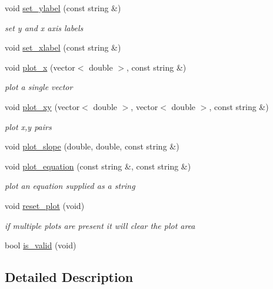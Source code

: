 \begin{DoxyCompactItemize}
void \mbox{\hyperlink{class_gnuplot_af85dd1d368699914112460285ead0fde}{set\+\_\+ylabel}} (const string \&)
\begin{DoxyCompactList}\small\item\em set y and x axis labels \end{DoxyCompactList}\item 
void \mbox{\hyperlink{class_gnuplot_ac9b0c04d47e375eb82f50437eda5e46e}{set\+\_\+xlabel}} (const string \&)
\item 
void \mbox{\hyperlink{class_gnuplot_ae3b7c28efb53f636431b9655085906be}{plot\+\_\+x}} (vector$<$ double $>$, const string \&)
\begin{DoxyCompactList}\small\item\em plot a single vector \end{DoxyCompactList}\item 
void \mbox{\hyperlink{class_gnuplot_a1e817a58ef3e40ceaeb128c7e6437e8a}{plot\+\_\+xy}} (vector$<$ double $>$, vector$<$ double $>$, const string \&)
\begin{DoxyCompactList}\small\item\em plot x,y pairs \end{DoxyCompactList}\item 
void \mbox{\hyperlink{class_gnuplot_a80c9d9e6bc3e64db073d9d39d6ec5d5f}{plot\+\_\+slope}} (double, double, const string \&)
\item 
void \mbox{\hyperlink{class_gnuplot_a55e6430f1329bf8a66f155dcacb9d112}{plot\+\_\+equation}} (const string \&, const string \&)
\begin{DoxyCompactList}\small\item\em plot an equation supplied as a string \end{DoxyCompactList}\item 
void \mbox{\hyperlink{class_gnuplot_ad54976652afe30231a850dd31e1ca70f}{reset\+\_\+plot}} (void)
\begin{DoxyCompactList}\small\item\em if multiple plots are present it will clear the plot area \end{DoxyCompactList}\item 
bool \mbox{\hyperlink{class_gnuplot_a0daaf54cd8e41dbbd574722f3a831cfd}{is\+\_\+valid}} (void)
\end{DoxyCompactItemize}


\subsection{Detailed Description}


